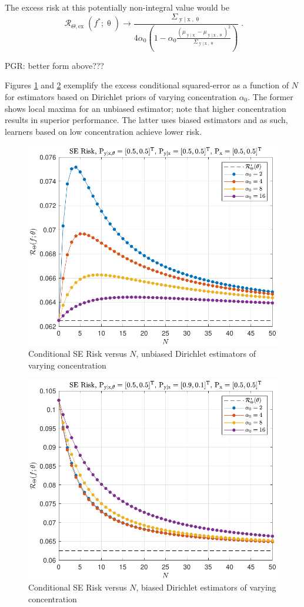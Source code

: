 \documentclass[12pt]{report}
\DeclareMathOperator{\xrm}{\mathrm{x}}
\DeclareMathOperator{\yrm}{\mathrm{y}}
\DeclareMathOperator{\Rcal}{\mathcal{R}}
\begin{document}
The excess risk at this potentially non-integral value would be 
\begin{equation}
\Rcal_{\Theta, \mathrm{ex}}(f^* ; \uptheta) \to \frac{\Sigma_{\yrm | \xrm,\uptheta}}{4 \alpha_0 \left( 1 - \alpha_0 \frac{\left( \mu_{\yrm | \xrm} - \mu_{\yrm | \xrm,\uptheta} \right)^2}{\Sigma_{\yrm | \xrm,\uptheta}} \right)} \;.
\end{equation}

PGR: better form above???

Figures \ref{fig:Risk_cond_SE_Dir_N_leg_a0_unbiased} and \ref{fig:Risk_cond_SE_Dir_N_leg_a0_biased} exemplify the excess conditional squared-error as a function of $N$ for estimators based on Dirichlet priors of varying concentration $\alpha_0$. The former shows local maxima for an unbiased estimator; note that higher concentration results in superior performance. The latter uses biased estimators and as such, learners based on low concentration achieve lower risk.
\begin{figure}
\centering
\includegraphics[width=0.7\linewidth]{Risk_cond_SE_Dir_N_leg_a0_unbiased.pdf}
\caption{Conditional SE Risk versus $N$, unbiased Dirichlet estimators of varying concentration}
\label{fig:Risk_cond_SE_Dir_N_leg_a0_unbiased}
\end{figure}
\begin{figure}
\centering
\includegraphics[width=0.7\linewidth]{Risk_cond_SE_Dir_N_leg_a0_biased.pdf}
\caption{Conditional SE Risk versus $N$, biased Dirichlet estimators of varying concentration}
\label{fig:Risk_cond_SE_Dir_N_leg_a0_biased}
\end{figure}
\end{document}
